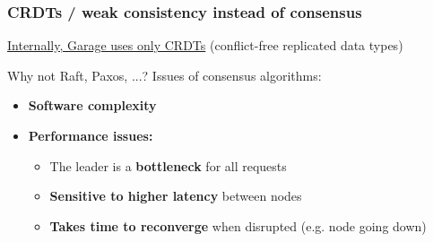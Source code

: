 \documentclass[aspectratio=169,xcolor={svgnames}]{beamer}
\begin{document}
\begin{frame}
	\frametitle{CRDTs / weak consistency instead of consensus}

	\underline{Internally, Garage uses only CRDTs} (conflict-free replicated data types)

	\vspace{2em}
	Why not Raft, Paxos, ...? Issues of consensus algorithms:

	\vspace{1em}
	\begin{itemize}
		\item<2-> \textbf{Software complexity}
			\vspace{1em}
		\item<3-> \textbf{Performance issues:}
			\vspace{.5em}
			\begin{itemize}
				\item<4-> The leader is a \textbf{bottleneck} for all requests\\
					\vspace{.5em}
				\item<5-> \textbf{Sensitive to higher latency} between nodes
					\vspace{.5em}
				\item<6-> \textbf{Takes time to reconverge} when disrupted (e.g. node going down)
			\end{itemize}
	\end{itemize}
\end{frame}
\end{document}
